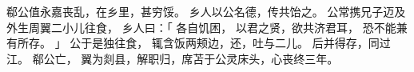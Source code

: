 
\switchcolumn*[\section{}]

郗公值永嘉丧乱，在乡里，甚穷馁。
乡人以公名德，传共饴之。
公常携兄子迈及外生周翼二小儿往食，
乡人曰：「
    各自饥困，
    以君之贤，欲共济君耳，
    恐不能兼有所存。
」
公于是独往食，
辄含饭两颊边，还，吐与二儿。
后并得存，同过江。
郗公亡，
翼为剡县，解职归，席苫于公灵床头，心丧终三年。

\switchcolumn


